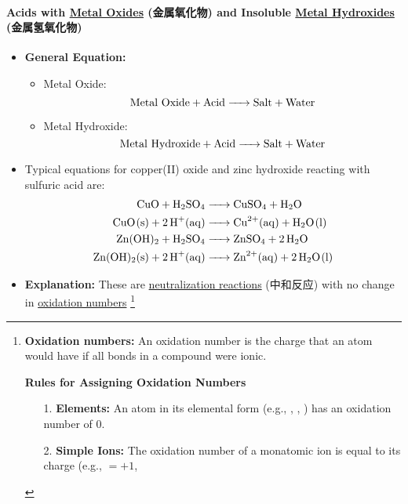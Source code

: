\paragraph{Acids with \underline{Metal Oxides} (金属氧化物) and Insoluble \underline{Metal Hydroxides} (金属氢氧化物)}
\begin{itemize}
    \item \textbf{General Equation:}
    \begin{itemize}
        \item Metal Oxide:
        \begin{equation}
            \ce{\text{Metal Oxide} + \text{Acid} -> \text{Salt} + \text{Water}}
        \end{equation}
        \item Metal Hydroxide:
        \begin{equation}
            \ce{\text{Metal Hydroxide} + \text{Acid} -> \text{Salt} + \text{Water}}
        \end{equation}
    \end{itemize}
    \item Typical equations for copper(II) oxide and zinc hydroxide reacting with sulfuric acid are:
    \begin{equation}
        \begin{split}
            \ce{CuO + H2SO4 &-> CuSO4 + H2O}\\
            \ce{CuO(s) + 2H+(aq) &-> Cu^{2+}(aq) + H2O(l)}\\
            \ce{Zn(OH)2 + H2SO4 &-> ZnSO4 + 2H2O}\\
            \ce{Zn(OH)2(s) + 2H+(aq) &-> Zn^{2+}(aq) + 2H2O(l)}
        \end{split}
    \end{equation}
    \item \textbf{Explanation:} These are \underline{neutralization reactions} (中和反应) with no change in
    \underline{oxidation numbers} \footnote{\textbf{Oxidation numbers:} An oxidation number is the charge that an atom would have
    if all bonds in a compound were ionic.\par
    \textbf{Rules for Assigning Oxidation Numbers}
    \begin{itemize}
        \item[1.] \textbf{Elements:} An atom in its elemental form (e.g., , , ) has an oxidation number of 0.
        \item[2.] \textbf{Simple Ions:} The oxidation number of a monatomic ion is equal to its charge (e.g., $=+1$,

\end{itemize}}
\end{itemize}
